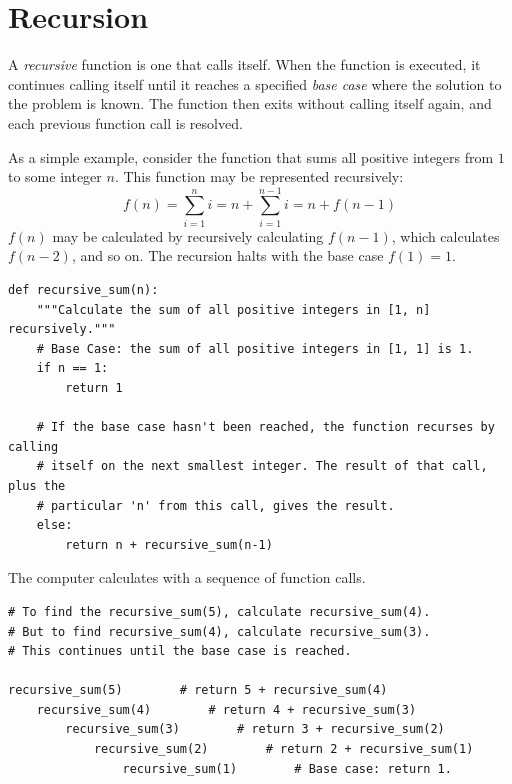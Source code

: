 \label{lab:Python_DataStructures2}


\section*{Recursion} %

A \emph{recursive} function is one that calls itself.
When the function is executed, it continues calling itself until it reaches a specified \emph{base case} where the solution to the problem is known.
The function then exits without calling itself again, and each previous function call is resolved.

As a simple example, consider the function that sums all positive integers from $1$ to some integer $n$.
This function may be represented recursively:
\[f(n) = \sum_{i=1}^ni = n + \sum_{i=1}^{n-1}i = n + f(n-1)\]
$f(n)$ may be calculated by recursively calculating $f(n-1)$, which calculates $f(n-2)$, and so on.
The recursion halts with the base case $f(1) = 1$.

\begin{lstlisting}
def recursive_sum(n):
	"""Calculate the sum of all positive integers in [1, n] recursively."""
    # Base Case: the sum of all positive integers in [1, 1] is 1.
	if n == 1:
		return 1

	# If the base case hasn't been reached, the function recurses by calling
    # itself on the next smallest integer. The result of that call, plus the
    # particular 'n' from this call, gives the result.
	else:
		return n + recursive_sum(n-1)
\end{lstlisting}

The computer calculates  with a sequence of function calls.

\begin{lstlisting}
# To find the recursive_sum(5), calculate recursive_sum(4).
# But to find recursive_sum(4), calculate recursive_sum(3).
# This continues until the base case is reached.

recursive_sum(5)		# return 5 + recursive_sum(4)
	recursive_sum(4)		# return 4 + recursive_sum(3)
		recursive_sum(3)		# return 3 + recursive_sum(2)
			recursive_sum(2)		# return 2 + recursive_sum(1)
				recursive_sum(1)		# Base case: return 1.
\end{lstlisting}

